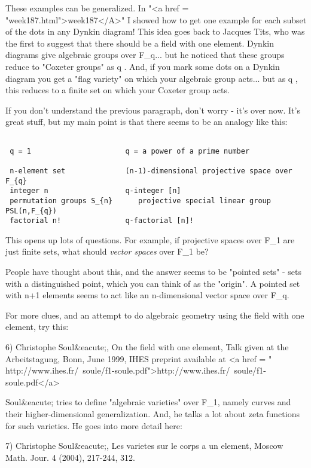 These examples can be generalized.  In "<a href =
"week187.html">week187</A>" I showed how to get one example for
each subset of the dots in any Dynkin diagram!  This idea goes back to
Jacques Tits, who was the first to suggest that there should be a
field with one element.  Dynkin diagrams give algebraic groups over
F_{q}... but he noticed that these groups reduce to
"Coxeter groups" as q .  And, if you mark some dots
on a Dynkin diagram you get a "flag variety" on which your
algebraic group acts... but as q , this reduces to a finite set
on which your Coxeter group acts.

If you don't understand the previous paragraph, don't worry - it's
over now.  It's great stuff, but my main point is that there seems to 
be an analogy like this:


\begin{verbatim}

 q = 1                      q = a power of a prime number    

 n-element set              (n-1)-dimensional projective space over F_{q}
 integer n                  q-integer [n]
 permutation groups S_{n}      projective special linear group PSL(n,F_{q})
 factorial n!               q-factorial [n]!
\end{verbatim}
    

This opens up lots of questions.  For example, if projective spaces over
F_{1} are just finite sets, what should \emph{vector spaces} 
over F_{1} be?  

People have thought about this, and the answer seems to be
"pointed sets" - sets with a distinguished point, which you
can think of as the "origin".  A pointed set with n+1
elements seems to act like an n-dimensional vector space over
F_{q}.

For more clues, and an attempt to do algebraic geometry using the 
field with one element, try this:

6) Christophe Soul&eacute;, On the field with one element, Talk given at the 
Arbeitstagung, Bonn, June 1999, IHES preprint available at
<a href = " http://www.ihes.fr/~soule/f1-soule.pdf">http://www.ihes.fr/~soule/f1-soule.pdf</a>

Soul&eacute; tries to define "algebraic varieties" over
F_{1}, namely curves and their higher-dimensional
generalization.  And, he talks a lot about zeta functions for such
varieties.  He goes into more detail here:

7) Christophe Soul&eacute;, Les varietes sur le corps a un element, Moscow
Math. Jour. 4 (2004), 217-244, 312.

